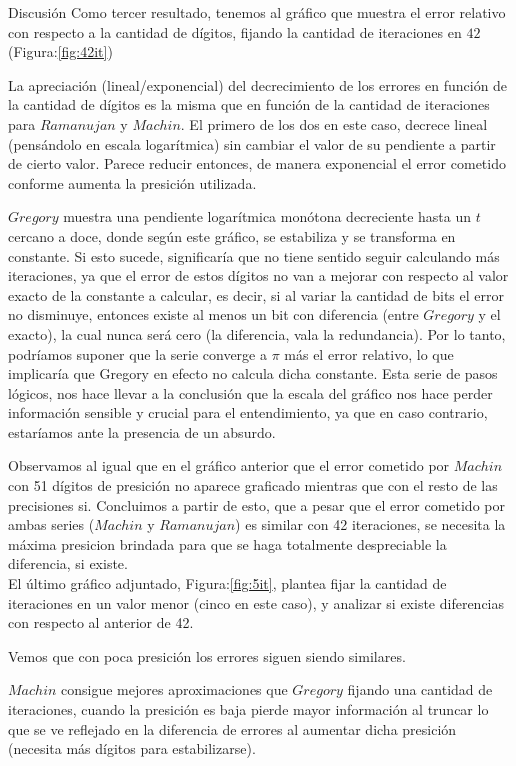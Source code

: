 \begin{section}{Discusión}
	Como tercer resultado, tenemos al gráfico que muestra el error relativo con respecto a la cantidad de dígitos, fijando la cantidad de iteraciones en $42$ (Figura:\ref{fig:42it})
	
	La apreciación (lineal/exponencial) del decrecimiento de los errores en función de la cantidad de dígitos es la misma que en función de la cantidad de iteraciones para $Ramanujan$ y $Machin$. El primero de los dos en este caso, decrece lineal (pensándolo en escala logarítmica) sin cambiar el valor de su pendiente a partir de cierto valor. Parece reducir entonces, de manera exponencial el error cometido conforme aumenta la presición utilizada.
	
	$Gregory$ muestra una pendiente logarítmica monótona decreciente hasta un $t$ cercano a doce, donde según este gráfico, se estabiliza y se transforma en constante. Si esto sucede, significaría que no tiene sentido seguir calculando más iteraciones, ya que el error de estos dígitos no van a mejorar con respecto al valor exacto de la constante a calcular, es decir, si al variar la cantidad de bits el error no disminuye, entonces existe al menos un bit con diferencia (entre $Gregory$ y el exacto), la cual nunca será cero (la diferencia, vala la redundancia). Por lo tanto, podríamos suponer que la serie converge a $\pi$ más el error relativo, lo que implicaría que Gregory en efecto no calcula dicha constante. Esta serie de pasos lógicos, nos hace llevar a la conclusión que la escala del gráfico nos hace perder información sensible y crucial para el entendimiento, ya que en caso contrario, estaríamos ante la presencia de un absurdo.
	
	Observamos al igual que en el gráfico anterior que el error cometido por $Machin$ con 51 dígitos de presición no aparece graficado mientras que con el resto de las precisiones si. Concluimos a partir de esto, que a pesar que el error cometido por ambas series ($Machin$ y $Ramanujan$) es similar con 42 iteraciones, se necesita la máxima presicion brindada para que se haga totalmente despreciable la diferencia, si existe.\\
	
	El último gráfico adjuntado, Figura:\ref{fig:5it}, plantea fijar la cantidad de iteraciones en un valor menor (cinco en este caso), y analizar si existe diferencias con respecto al anterior de 42.
	
	Vemos que con poca presición los errores siguen siendo similares.
	
	$Machin$ consigue mejores aproximaciones que $Gregory$ fijando una cantidad de iteraciones, cuando la presición es baja pierde mayor información al truncar lo que se ve reflejado en la diferencia de errores al aumentar dicha presición (necesita más dígitos para estabilizarse).
	

\end{section}
